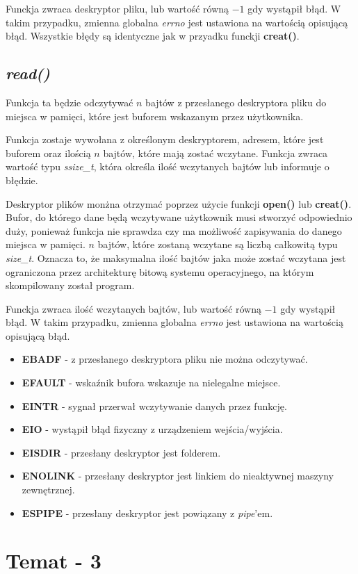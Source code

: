 \documentclass{article}
\begin{document}
Funckja zwraca deskryptor pliku, lub wartość równą $-1$ gdy wystąpił błąd.
W takim przypadku, zmienna globalna \textit{errno} jest ustawiona na wartością opisującą błąd.
Wszystkie błędy są identyczne jak w przyadku funckji \textbf{creat()}.

\subsection{\textit{read()}}
Funkcja ta będzie odczytywać $n$ bajtów z przesłanego deskryptora pliku do miejsca w pamięci,
które jest buforem wskazanym przez użytkownika.

Funkcja zostaje wywołana z określonym deskryptorem, adresem, które jest buforem oraz ilością $n$ bajtów, które mają zostać wczytane. Funkcja zwraca wartość typu \textit{ssize\_t}, która określa ilość wczytanych bajtów lub informuje o błędzie.

Deskryptor plików monżna otrzymać poprzez użycie funkcji \textbf{open()} lub \textbf{creat()}.
Bufor, do którego dane będą wczytywane użytkownik musi stworzyć odpowiednio duży, ponieważ funkcja nie sprawdza czy ma możliwość zapisywania do danego miejsca w pamięci.
$n$ bajtów, które zostaną wczytane są liczbą całkowitą typu \textit{size\_t}.
Oznacza to, że maksymalna ilość bajtów jaka może zostać wczytana jest ograniczona przez architekturę bitową systemu operacyjnego, na którym skompilowany został program.

Funckja zwraca ilość wczytanych bajtów, lub wartość równą $-1$ gdy wystąpił błąd.
W takim przypadku, zmienna globalna \textit{errno} jest ustawiona na wartością opisującą błąd.

\begin{itemize}
\item \textbf{EBADF} - z przesłanego deskryptora pliku nie można odczytywać.
\item \textbf{EFAULT} - wskaźnik bufora wskazuje na nielegalne miejsce.
\item \textbf{EINTR} - sygnał przerwał wczytywanie danych przez funkcję.
\item \textbf{EIO} - wystąpił błąd fizyczny z urządzeniem wejścia/wyjścia.
\item \textbf{EISDIR} - przesłany deskryptor jest folderem.
\item \textbf{ENOLINK} - przesłany deskryptor jest linkiem do nieaktywnej maszyny zewnętrznej.
\item \textbf{ESPIPE} - przesłany deskryptor jest powiązany z \textit{pipe}'em.
\end{itemize}
  
\section{Temat - 3}
\end{document}
